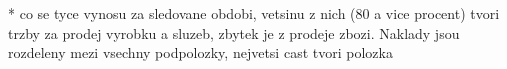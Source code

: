 * co se tyce vynosu za sledovane obdobi, vetsinu z nich (80 a vice procent) tvori trzby za prodej vyrobku a sluzeb, zbytek je z prodeje zbozi. Naklady jsou rozdeleny mezi vsechny podpolozky, nejvetsi cast tvori polozka 

